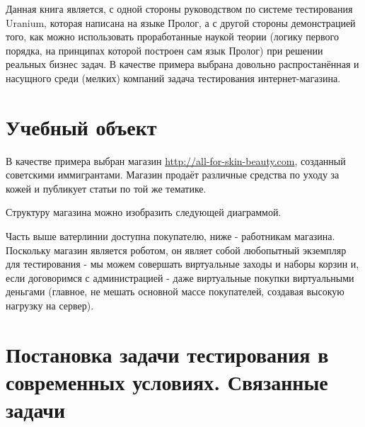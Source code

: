 \documentclass[a4paper]{book}
\def\ur{Uranium}
\begin{document}
Данная книга является, с одной стороны руководством по системе
тестирования \ur, которая написана на языке Пролог, а с другой
стороны демонстрацией того, как можно использовать проработанные
наукой теории (логику первого порядка, на принципах которой
построен сам язык Пролог) при решении реальных бизнес задач. В
качестве примера выбрана довольно распростанённая и насущного
среди (мелких) компаний задача тестирования интернет-магазина.

\section{Учебный объект}

В качестве примера выбран магазин
\url{http://all-for-skin-beauty.com}, созданный советскими
иммигрантами. Магазин продаёт различные средства по уходу за
кожей и публикует статьи по той же тематике.

Структуру магазина можно изобразить следующей диаграммой.

Часть выше ватерлинии доступна покупателю, ниже - работникам
магазина. Поскольку магазин является роботом, он являет собой
любопытный экземпляр для тестирования - мы можем совершать
виртуальные заходы и наборы корзин и, если договоримся с
администрацией - даже виртуальные покупки виртуальными деньгами
(главное, не мешать основной массе покупателей, создавая высокую
нагрузку на сервер).


\section{Постановка задачи тестирования в современных условиях. 
         Связанные задачи}
\end{document}
